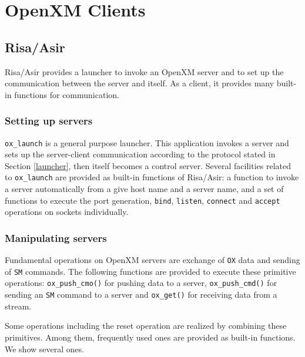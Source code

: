 
\section{OpenXM Clients}    

\subsection{Risa/Asir}

Risa/Asir provides a launcher to invoke an OpenXM server and to set up the
communication between the server and itself. As a client, 
it provides many built-in functions for communication.

\subsubsection{Setting up servers}
{\tt ox\_launch} is a general purpose launcher.  This application
invokes a server and sets up the server-client communication
according to the protocol stated in Section \ref{launcher}, then
itself becomes a control server.
Several facilities related to {{\tt ox\_launch}} are provided
as built-in functions of Risa/Asir: a function to invoke a server
automatically from a give host name and a server name, and a set 
of functions to execute the port generation, {\tt bind}, {\tt listen},
{\tt connect} and {\tt accept} operations on sockets individually.

\subsubsection{Manipulating servers}
Fundamental operations on OpenXM servers are 
exchange of {\tt OX} data and sending of {\tt SM} commands.
The following functions
are provided to execute these primitive operations:
{\tt ox\_push\_cmo()} for pushing data to a server, 
{\tt ox\_push\_cmd()} for sending an {\tt SM} command to a server
and {\tt ox\_get()} for receiving data from a stream.

Some operations including the reset operation are realized by
combining these primitives.  Among them, frequently used ones are
provided as built-in functions. We show several ones.

